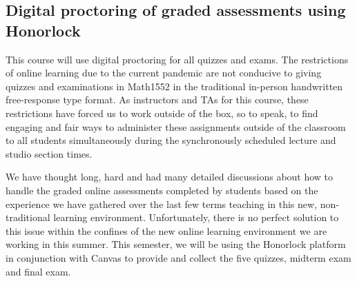 \documentclass[11pt]{article}
\begin{document}
    \subsection{Digital proctoring of graded assessments using Honorlock}
    This course will use digital proctoring for all quizzes and exams.
    The restrictions of online learning due to the current pandemic are not conducive 
    to giving quizzes and examinations in Math1552 in the traditional in-person handwritten 
    free-response type format. As instructors and TAs for this course, these restrictions have forced us to 
    work outside of the box, so to speak, to find engaging and fair ways to administer these assignments 
    outside of the classroom to all students simultaneously during the synchronously scheduled lecture and 
    studio section times. 

    We have thought long, hard and had many detailed 
    discussions about how to handle the 
    graded online assessments completed by students based on the experience we have gathered over the 
    last few terms teaching in this new, non-traditional learning environment. Unfortunately, 
    there is no perfect 
    solution to this issue within the confines of the new online learning environment we are working in 
    this summer. 
    This semester, we will be using the Honorlock platform in conjunction with 
    Canvas to provide and collect the five quizzes, midterm exam and final exam. 
\end{document}
